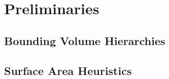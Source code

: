 
\chapter{Preliminaries}
\label{ch:preliminaries}

\section{Bounding Volume Hierarchies}
\label{sec:preliminaries:bvh}

\section{Surface Area Heuristics}
\label{sec:preliminaries:sah}